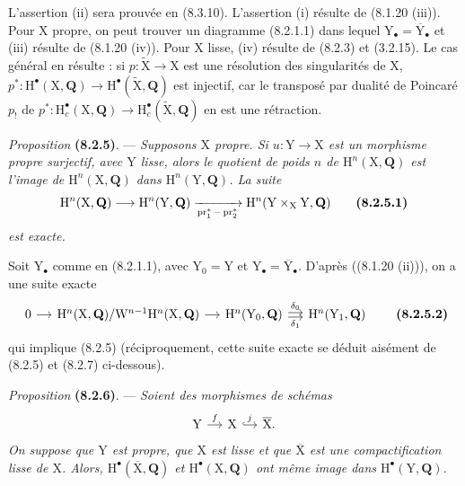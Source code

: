 \documentclass[11pt,leqno]{article}
\begin{document}
L’assertion (ii) sera prouvée en (8.3.10). L’assertion (i) résulte de (8.1.20 (iii)). Pour \(\mathrm{X}\) propre, on peut trouver un diagramme (8.2.1.1) dans lequel \(\mathrm{Y}_\bullet=\overline{\mathrm{Y}}_\bullet\) et (iii) résulte de (8.1.20 (iv)). Pour \(\mathrm{X}\) lisse, (iv) résulte de (8.2.3) et (3.2.15). Le cas général en résulte : si \(p:\widetilde{\mathrm{X}}\to\mathrm{X}\) est une résolution des singularités de \(\mathrm{X}\), \(p^*:\mathrm{H}^\bullet(\mathrm{X},\mathbf{Q})\to\mathrm{H}^\bullet(\widetilde{\mathrm{X}},\mathbf{Q})\) est injectif, car le transposé par dualité de Poincaré \(p_!\) de \(p^*:\mathrm{H}_c^\bullet(\mathrm{X},\mathbf{Q})\to\mathrm{H}_c^\bullet(\widetilde{\mathrm{X}},\mathbf{Q})\) en est une rétraction.

\textit{Proposition} \textbf{(8.2.5)}. — \textit{Supposons \(\mathrm{X}\) propre. Si \(u:\mathrm{Y}\to\mathrm{X}\) est un morphisme propre surjectif, avec \(\mathrm{Y}\) lisse, alors le quotient de poids \(n\) de \(\mathrm{H}^n(\mathrm{X},\mathbf{Q})\) est l’image de \(\mathrm{H}^n(\mathrm{X},\mathbf{Q})\) dans \(\mathrm{H}^n(\mathrm{Y},\mathbf{Q})\). La suite}
\[
\mathrm{H}^n(\mathrm{X},\mathbf{Q})
\longrightarrow
\mathrm{H}^n(\mathrm{Y},\mathbf{Q})
\xrightarrow[\operatorname{pr}_1^*-\operatorname{pr}_2^*]{}
\mathrm{H}^n(\mathrm{Y}\times_{\mathrm{X}}\mathrm{Y},\mathbf{Q})
\tag*{\textbf{(8.2.5.1)}}
\]
\textit{est exacte.}

Soit \(\mathrm{Y}_\bullet\) comme en (8.2.1.1), avec \(\mathrm{Y}_0=\mathrm{Y}\) et \(\mathrm{Y}_\bullet=\overline{\mathrm{Y}}_\bullet\). D’après ((8.1.20 (ii))), on a une suite exacte
\[
\begin{tikzcd}[column sep=small]
0 \arrow[r]
 & \mathrm{H}^n(\mathrm{X},\mathbf{Q})/
   \mathrm{W}^{n-1}\mathrm{H}^n(\mathrm{X},\mathbf{Q}) \arrow[r]
 & \mathrm{H}^n(\mathrm{Y}_0,\mathbf{Q})
   \arrow[r,shift left=.4ex,"\delta_0"]
   \arrow[r,shift right=.4ex,"\delta_1"']
 & \mathrm{H}^n(\mathrm{Y}_1,\mathbf{Q})
\end{tikzcd}
\tag*{\textbf{(8.2.5.2)}}
\]
qui implique (8.2.5) (réciproquement, cette suite exacte se déduit aisément de (8.2.5) et (8.2.7) ci-dessous).

\textit{Proposition} \textbf{(8.2.6)}. — \textit{Soient des morphismes de schémas}
\[
\begin{tikzcd}[column sep=small]
\mathrm{Y} \arrow[r,"f"]
 & \mathrm{X} \arrow[r,hook,"j"]
 & \overline{\mathrm{X}}.
\end{tikzcd}
\]
\textit{On suppose que \(\mathrm{Y}\) est propre, que \(\mathrm{X}\) est lisse et que \(\overline{\mathrm{X}}\) est une compactification lisse de \(\mathrm{X}\). Alors, \(\mathrm{H}^\bullet(\overline{\mathrm{X}},\mathbf{Q})\) et \(\mathrm{H}^\bullet(\mathrm{X},\mathbf{Q})\) ont même image dans \(\mathrm{H}^\bullet(\mathrm{Y},\mathbf{Q})\).}
\end{document}
